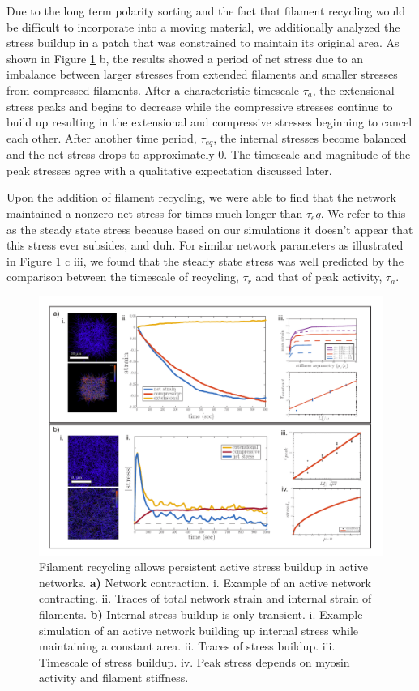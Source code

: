 \documentclass[10pt,letterpaper]{article}
\begin{document}
Due to the long term polarity sorting and the fact that filament recycling would be difficult to incorporate into a moving material, we additionally analyzed the stress buildup in a patch that was constrained to maintain its original area.  As shown in Figure \ref{fig:active} b, the results showed a period of net stress due to an imbalance between larger stresses from extended filaments and smaller stresses from compressed filaments.  After a characteristic timescale $\tau_a$, the extensional stress peaks and begins to decrease while the compressive stresses continue to build up resulting in the extensional and compressive stresses beginning to cancel each other.  After another time period, $\tau_{eq}$, the internal stresses become balanced and the net stress drops to approximately 0. The timescale and magnitude of the peak stresses agree with a qualitative expectation discussed later.

Upon the addition of filament recycling, we were able to find that the network maintained a nonzero net stress for times much longer than $\tau_eq$.  We refer to this as the steady state stress because based on our simulations it doesn't appear that this stress ever subsides, and duh.  For similar network parameters as illustrated in Figure \ref{fig:active} c iii, we found that the steady state stress was well predicted by the comparison between the timescale of recycling, $\tau_r$ and that of peak activity, $\tau_a$. 


\begin{figure}[h!]
\centering
\includegraphics[width=\hsize]{figures/fig4/fig4}
\caption{\label{fig:active} Filament recycling allows persistent active stress buildup in active networks.  \textbf{a)} Network contraction. i. Example of an active network contracting. ii. Traces of total network strain and internal strain of filaments. \textbf{b)} Internal stress buildup is only transient. i. Example simulation of an active network building up internal stress while maintaining a constant area. ii. Traces of stress buildup. iii. Timescale of stress buildup. iv. Peak stress depends on myosin activity and filament stiffness. }
\end{figure}
\end{document}
